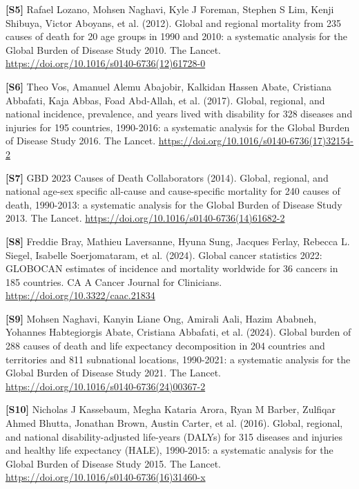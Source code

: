 \documentclass[10pt,a4paper]{article}
\begin{document}
\noindent\textbf{[S5]} Rafael Lozano, Mohsen Naghavi, Kyle J Foreman, Stephen S Lim, Kenji Shibuya, Victor Aboyans, et al. (2012). Global and regional mortality from 235 causes of death for 20 age groups in 1990 and 2010: a systematic analysis for the Global Burden of Disease Study 2010. The Lancet. \url{https://doi.org/10.1016/s0140-6736(12)61728-0}\par

\noindent\textbf{[S6]} Theo Vos, Amanuel Alemu Abajobir, Kalkidan Hassen Abate, Cristiana Abbafati, Kaja Abbas, Foad Abd-Allah, et al. (2017). Global, regional, and national incidence, prevalence, and years lived with disability for 328 diseases and injuries for 195 countries, 1990-2016: a systematic analysis for the Global Burden of Disease Study 2016. The Lancet. \url{https://doi.org/10.1016/s0140-6736(17)32154-2}\par

\noindent\textbf{[S7]} GBD 2023 Causes of Death Collaborators (2014). Global, regional, and national age-sex specific all-cause and cause-specific mortality for 240 causes of death, 1990-2013: a systematic analysis for the Global Burden of Disease Study 2013. The Lancet. \url{https://doi.org/10.1016/s0140-6736(14)61682-2}\par

\noindent\textbf{[S8]} Freddie Bray, Mathieu Laversanne, Hyuna Sung, Jacques Ferlay, Rebecca L. Siegel, Isabelle Soerjomataram, et al. (2024). Global cancer statistics 2022: GLOBOCAN estimates of incidence and mortality worldwide for 36 cancers in 185 countries. CA A Cancer Journal for Clinicians. \url{https://doi.org/10.3322/caac.21834}\par

\noindent\textbf{[S9]} Mohsen Naghavi, Kanyin Liane Ong, Amirali Aali, Hazim Ababneh, Yohannes Habtegiorgis Abate, Cristiana Abbafati, et al. (2024). Global burden of 288 causes of death and life expectancy decomposition in 204 countries and territories and 811 subnational locations, 1990-2021: a systematic analysis for the Global Burden of Disease Study 2021. The Lancet. \url{https://doi.org/10.1016/s0140-6736(24)00367-2}\par

\noindent\textbf{[S10]} Nicholas J Kassebaum, Megha Kataria Arora, Ryan M Barber, Zulfiqar Ahmed Bhutta, Jonathan Brown, Austin Carter, et al. (2016). Global, regional, and national disability-adjusted life-years (DALYs) for 315 diseases and injuries and healthy life expectancy (HALE), 1990-2015: a systematic analysis for the Global Burden of Disease Study 2015. The Lancet. \url{https://doi.org/10.1016/s0140-6736(16)31460-x}\par
\end{document}
